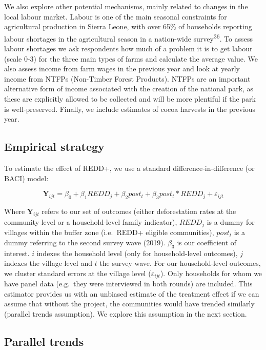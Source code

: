 \documentclass[
]{article}
\begin{document}
We also explore other potential mechanisms, mainly related to changes in
the local labour market. Labour is one of the main seasonal constraints
for agricultural production in Sierra Leone, with over 65\% of
households reporting labour shortages in the agricultural season in a
nation-wide survey\textsuperscript{36}. To assess labour shortages we
ask respondents how much of a problem it is to get labour (scale 0-3)
for the three main types of farms and calculate the average value. We
also assess income from farm wages in the previous year and look at
yearly income from NTFPs (Non-Timber Forest Products). NTFPs are an
important alternative form of income associated with the creation of the
national park, as these are explicitly allowed to be collected and will
be more plentiful if the park is well-preserved. Finally, we include
estimates of cocoa harvests in the previous year.

\hypertarget{empirical-strategy}{%
\subsection{Empirical strategy}\label{empirical-strategy}}

To estimate the effect of REDD+, we use a standard
difference-in-difference (or BACI) model:

\[ \mathbf{Y}_{ijt}=\beta_0 + \beta_1REDD_j + \beta_2post_t  +\beta_3post_t*REDD_j + \varepsilon_{ijt} \]

Where \(\mathbf{Y}_{ijt}\) refers to our set of outcomes (either
deforestation rates at the community level or a household-level family
indicator), \(REDD_j\) is a dummy for villages within the buffer zone
(i.e.~REDD+ eligible communities), \(post_t\) is a dummy referring to
the second survey wave (2019). \(\beta_3\) is our coefficient of
interest. \(i\) indexes the household level (only for household-level
outcomes), \(j\) indexes the village level and \(t\) the survey wave.
For our household-level outcomes, we cluster standard errors at the
village level (\(\varepsilon_{ijt}\)). Only households for whom we have
panel data (e.g.~they were interviewed in both rounds) are included.
This estimator provides us with an unbiased estimate of the treatment
effect if we can assume that without the project, the communities would
have trended similarly (parallel trends assumption). We explore this
assumption in the next section.

\hypertarget{parallel-trends}{%
\subsection{Parallel trends}\label{parallel-trends}}
\end{document}
